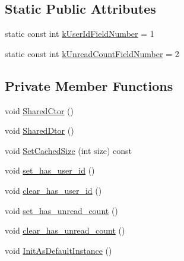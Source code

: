 \subsection*{Static Public Attributes}
\begin{DoxyCompactItemize}
\item 
static const int \hyperlink{class_i_m_1_1_base_define_1_1_client_un_read_info_a0a4f58f2e8bf8d963c1e126d37885d22}{k\+User\+Id\+Field\+Number} = 1
\item 
static const int \hyperlink{class_i_m_1_1_base_define_1_1_client_un_read_info_ae7afcb7461cdcbf91e97926809b14f3c}{k\+Unread\+Count\+Field\+Number} = 2
\end{DoxyCompactItemize}
\subsection*{Private Member Functions}
\begin{DoxyCompactItemize}
\item 
void \hyperlink{class_i_m_1_1_base_define_1_1_client_un_read_info_ac28b034842c33c6618e97db1b2f3cfc1}{Shared\+Ctor} ()
\item 
void \hyperlink{class_i_m_1_1_base_define_1_1_client_un_read_info_a2c4b085cc698d1be5b2a25f143de531a}{Shared\+Dtor} ()
\item 
void \hyperlink{class_i_m_1_1_base_define_1_1_client_un_read_info_ae1d2d1da0fd2e104bb7f659c75162bb1}{Set\+Cached\+Size} (int size) const 
\item 
void \hyperlink{class_i_m_1_1_base_define_1_1_client_un_read_info_a7dfbec3ff1dd038991544103c16abcef}{set\+\_\+has\+\_\+user\+\_\+id} ()
\item 
void \hyperlink{class_i_m_1_1_base_define_1_1_client_un_read_info_a32570b126ae1498f765846b619a2a134}{clear\+\_\+has\+\_\+user\+\_\+id} ()
\item 
void \hyperlink{class_i_m_1_1_base_define_1_1_client_un_read_info_ab327fdde630b93081a7f65c09a9211df}{set\+\_\+has\+\_\+unread\+\_\+count} ()
\item 
void \hyperlink{class_i_m_1_1_base_define_1_1_client_un_read_info_a646d3a996bcc8f539379f74f34ca0bb9}{clear\+\_\+has\+\_\+unread\+\_\+count} ()
\item 
void \hyperlink{class_i_m_1_1_base_define_1_1_client_un_read_info_ac03598f270665c1a37abee621630a8db}{Init\+As\+Default\+Instance} ()
\end{DoxyCompactItemize}
